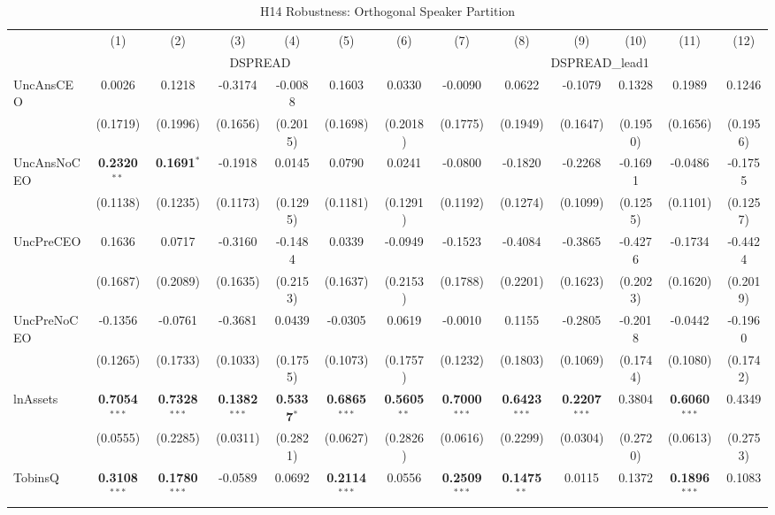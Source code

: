 \documentclass[11pt,a4paper]{article}
\begin{document}
\clearpage
\begin{table}[htbp]
\centering
\caption{H14 Robustness: Orthogonal Speaker Partition}
\label{tab:h14_robust}
\scriptsize
\begin{tabular}{lcccccccccccc}
\toprule
 & (1) & (2) & (3) & (4) & (5) & (6) & (7) & (8) & (9) & (10) & (11) & (12) \\
 & \multicolumn{6}{c}{DSPREAD} & \multicolumn{6}{c}{DSPREAD\_lead1} \\
\cmidrule(lr){2-7} \cmidrule(lr){8-13}
\midrule
UncAnsCEO & 0.0026 & 0.1218 & -0.3174 & -0.0088 & 0.1603 & 0.0330 & -0.0090 & 0.0622 & -0.1079 & 0.1328 & 0.1989 & 0.1246 \\
 & (0.1719) & (0.1996) & (0.1656) & (0.2015) & (0.1698) & (0.2018) & (0.1775) & (0.1949) & (0.1647) & (0.1950) & (0.1656) & (0.1956) \\
UncAnsNoCEO & \textbf{0.2320}$^{**}$ & \textbf{0.1691}$^{*}$ & -0.1918 & 0.0145 & 0.0790 & 0.0241 & -0.0800 & -0.1820 & -0.2268 & -0.1691 & -0.0486 & -0.1755 \\
 & (0.1138) & (0.1235) & (0.1173) & (0.1295) & (0.1181) & (0.1291) & (0.1192) & (0.1274) & (0.1099) & (0.1255) & (0.1101) & (0.1257) \\
UncPreCEO & 0.1636 & 0.0717 & -0.3160 & -0.1484 & 0.0339 & -0.0949 & -0.1523 & -0.4084 & -0.3865 & -0.4276 & -0.1734 & -0.4424 \\
 & (0.1687) & (0.2089) & (0.1635) & (0.2153) & (0.1637) & (0.2153) & (0.1788) & (0.2201) & (0.1623) & (0.2023) & (0.1620) & (0.2019) \\
UncPreNoCEO & -0.1356 & -0.0761 & -0.3681 & 0.0439 & -0.0305 & 0.0619 & -0.0010 & 0.1155 & -0.2805 & -0.2018 & -0.0442 & -0.1960 \\
 & (0.1265) & (0.1733) & (0.1033) & (0.1755) & (0.1073) & (0.1757) & (0.1232) & (0.1803) & (0.1069) & (0.1744) & (0.1080) & (0.1742) \\
\midrule
lnAssets & \textbf{0.7054}$^{***}$ & \textbf{0.7328}$^{***}$ & \textbf{0.1382}$^{***}$ & \textbf{0.5337}$^{*}$ & \textbf{0.6865}$^{***}$ & \textbf{0.5605}$^{**}$ & \textbf{0.7000}$^{***}$ & \textbf{0.6423}$^{***}$ & \textbf{0.2207}$^{***}$ & 0.3804 & \textbf{0.6060}$^{***}$ & 0.4349 \\
 & (0.0555) & (0.2285) & (0.0311) & (0.2821) & (0.0627) & (0.2826) & (0.0616) & (0.2299) & (0.0304) & (0.2720) & (0.0613) & (0.2753) \\
TobinsQ & \textbf{0.3108}$^{***}$ & \textbf{0.1780}$^{***}$ & -0.0589 & 0.0692 & \textbf{0.2114}$^{***}$ & 0.0556 & \textbf{0.2509}$^{***}$ & \textbf{0.1475}$^{**}$ & 0.0115 & 0.1372 & \textbf{0.1896}$^{***}$ & 0.1083 \\

\end{tabular}
\end{table}
\end{document}
